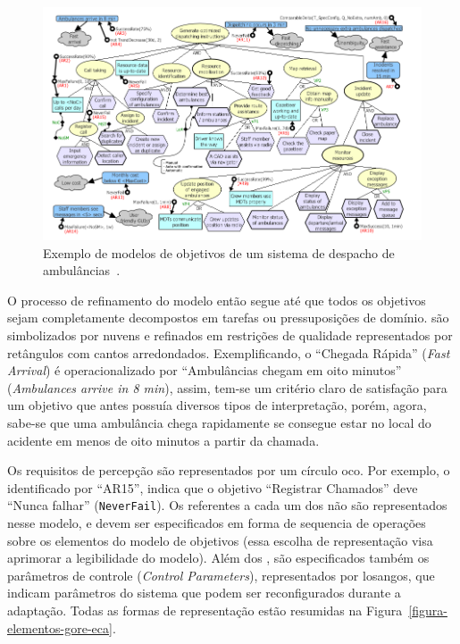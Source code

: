 \begin{figure}
	\centering
	\includegraphics[width=1\textwidth]{figuras/modelos/ACAD-Completo.png}
	\caption{Exemplo de modelos de objetivos de um sistema de despacho de ambulâncias~\cite{tesevitor}.}
	\label{figura-acad-completo}
\end{figure}

O processo de refinamento do modelo então segue até que todos os objetivos sejam completamente decompostos em tarefas ou pressuposições de domínio. \sofgoals são simbolizados por nuvens e refinados em restrições de qualidade representados por retângulos com cantos arredondados. Exemplificando, o \sofgoal ``Chegada Rápida'' (\textit{Fast Arrival}) é operacionalizado por ``Ambulâncias chegam em oito minutos'' (\textit{Ambulances arrive in 8 min}), assim, tem-se um critério claro de satisfação para um objetivo que antes possuía diversos tipos de interpretação, porém, agora, sabe-se que uma ambulância chega rapidamente se consegue estar no local do acidente em menos de oito minutos a partir da chamada.

Os requisitos de percepção são representados por um círculo oco. Por exemplo, o \awreq identificado por ``AR15'', indica que o objetivo ``Registrar Chamados'' deve ``Nunca falhar'' (\texttt{NeverFail}). Os \evoreqs referentes a cada um dos \awreqs não são representados nesse modelo, e devem ser especificados em forma de sequencia de operações sobre os elementos do modelo de objetivos (essa escolha de representação visa aprimorar a legibilidade do modelo). Além dos \awreqs, são especificados também os parâmetros de controle (\textit{Control Parameters}), representados por losangos, que indicam parâmetros do sistema que podem ser reconfigurados durante a adaptação. Todas as formas de representação estão resumidas na Figura~\ref{figura-elementos-gore-eca}.


